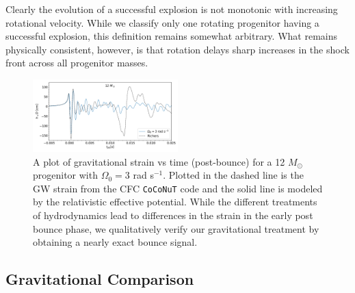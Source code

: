 \documentclass[twocolumn,times]{aastex62}  %
\begin{document}
Clearly the evolution of a successful explosion is not monotonic with increasing rotational velocity.  While we classify only one rotating progenitor having a successful explosion, this definition remains somewhat arbitrary.  What remains physically consistent, however, is that rotation delays sharp increases in the shock front across all progenitor masses.



 \begin{figure}[t]
    \centering
    \includegraphics[width=0.5\textwidth]{figures/bounce_richers.pdf}
    \caption{A plot of gravitational strain vs time (post-bounce) for a 12 \(M_\odot\) progenitor with $\Omega_0 = 3$ rad s$^{-1}$.  Plotted in the dashed line is the GW strain from the CFC \texttt{CoCoNuT} code and the solid line is modeled by the relativistic effective potential.  While the different treatments of hydrodynamics lead to differences in the strain in the early post bounce phase, we qualitatively verify our gravitational treatment by obtaining a nearly exact bounce signal. }
    \label{fig:bounce_cfc}
\end{figure}

\subsection{Gravitational Comparison}
\end{document}
